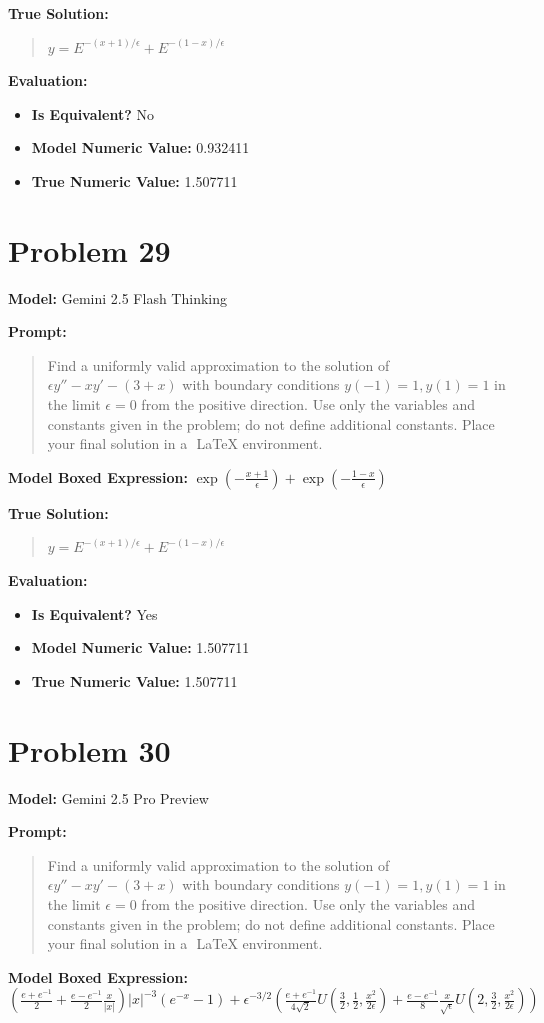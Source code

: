 \documentclass{article}
\begin{document}
\textbf{True Solution:}
\begin{quote}
$y = E^{-(x+1)/\epsilon}+ E^{-(1-x)/\epsilon}$
\end{quote}

\textbf{Evaluation:}
\begin{itemize}
\item \textbf{Is Equivalent?} No
\item \textbf{Model Numeric Value:} 0.932411
\item \textbf{True Numeric Value:} 1.507711
\end{itemize}
\vspace{1cm}
\section*{Problem 29}
\textbf{Model:} Gemini 2.5 Flash Thinking

\textbf{Prompt:}
\begin{quote}
Find a uniformly valid approximation to the solution of $\epsilon y''-x y'-(3+x)$ with boundary conditions $y(-1)=1, y(1)=1$ in the limit $\epsilon = 0$ from the positive direction. Use only the variables and constants given in the problem; do not define additional constants. Place your final solution in a $\boxed{}$ LaTeX environment.
\end{quote}
\textbf{Model Boxed Expression:} $\exp\left(-\frac{x+1}{\epsilon}\right) + \exp\left(-\frac{1-x}{\epsilon}\right)$

\textbf{True Solution:}
\begin{quote}
$y = E^{-(x+1)/\epsilon}+ E^{-(1-x)/\epsilon}$
\end{quote}

\textbf{Evaluation:}
\begin{itemize}
\item \textbf{Is Equivalent?} Yes
\item \textbf{Model Numeric Value:} 1.507711
\item \textbf{True Numeric Value:} 1.507711
\end{itemize}
\vspace{1cm}
\section*{Problem 30}
\textbf{Model:} Gemini 2.5 Pro Preview

\textbf{Prompt:}
\begin{quote}
Find a uniformly valid approximation to the solution of $\epsilon y''-x y'-(3+x)$ with boundary conditions $y(-1)=1, y(1)=1$ in the limit $\epsilon = 0$ from the positive direction. Use only the variables and constants given in the problem; do not define additional constants. Place your final solution in a $\boxed{}$ LaTeX environment.
\end{quote}
\textbf{Model Boxed Expression:} $\left(\frac{e+e^{-1}}{2} + \frac{e-e^{-1}}{2}\frac{x}{|x|}\right)|x|^{-3}(e^{-x}-1) + \epsilon^{-3/2}\left(\frac{e+e^{-1}}{4\sqrt{2}}U\left(\frac{3}{2},\frac{1}{2},\frac{x^2}{2\epsilon}\right) + \frac{e-e^{-1}}{8}\frac{x}{\sqrt{\epsilon}}U\left(2,\frac{3}{2},\frac{x^2}{2\epsilon}\right)\right)$
\end{document}
